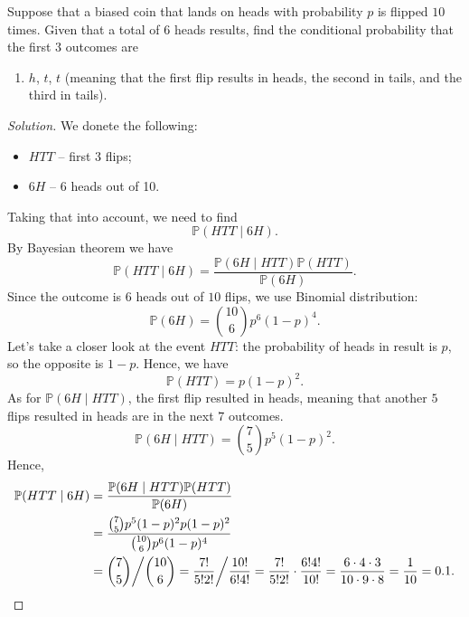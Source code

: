 \documentclass{article}[12pt]
\newenvironment{solution}
  {\renewcommand\qedsymbol{$\blacksquare$}\begin{proof}[Solution]}
  {\end{proof}}
\newenvironment{problem}[1]
  {\renewcommand\theinnercustomprblm{#1}\innercustomprblm}
  {\endinnercustomprblm}
\renewcommand{\P}{\mathbb{P}}
\begin{document}
\begin{problem}{4.50(a)}\normalfont
Suppose that a biased coin that lands on heads with probability $p$ is flipped $10$ times. 
Given that a total of $6$ heads results, find the conditional probability that the first $3$ outcomes are
\begin{enumerate}[label=(\alph*)]
    \item $h$, $t$, $t$ (meaning that the first flip results in heads, the second in tails, and the third in tails).
\end{enumerate}
\end{problem}
\begin{solution}
We donete the following:
\begin{itemize}
    \item $HTT$ -- first 3 flips;
    \item $6H$ -- 6 heads out of 10.
\end{itemize}
Taking that into account, we need to find
\begin{equation*}
    \P(HTT\mid 6H).
\end{equation*}
By Bayesian theorem we have
\begin{equation*}
    \P(HTT\mid 6H) = \dfrac{\P(6H\mid HTT)\P(HTT)}{\P(6H)}.
\end{equation*}
Since the outcome is $6$ heads out of $10$ flips, we use Binomial distribution:
\begin{equation*}
    \P(6H) = \binom{10}{6}p^{6}(1 - p)^{4}.
\end{equation*}
Let's take a closer look at the event $HTT$: the probability of heads in result is $p$, so the opposite is $1 - p$.
Hence, we have
\begin{equation*}
    \P(HTT) = p(1 - p)^{2}.
\end{equation*}
As for $\P(6H\mid HTT)$, the first flip resulted in heads, meaning that another $5$ flips resulted in heads are in the next $7$ outcomes.
\begin{equation*}
    \P(6H\mid HTT) = \binom{7}{5}p^{5}(1 - p)^{2}.
\end{equation*}
Hence,
\begin{align*}
    \P(HTT\mid 6H) &= \dfrac{\P(6H\mid HTT)\P(HTT)}{\P(6H)}
    \\
    &=\dfrac{\binom{7}{5}p^{5}(1 - p)^{2}p(1 - p)^{2}}{\binom{10}{6}p^{6}(1 - p)^{4}}
    \\
    &=\dbinom{7}{5}\bigg/\dbinom{10}{6} = \dfrac{7!}{5!2!}\bigg/\dfrac{10!}{6!4!} = \dfrac{7!}{5!2!}\cdot\dfrac{6!4!}{10!} = \dfrac{6\cdot 4\cdot 3}{10\cdot 9\cdot 8} = \dfrac{1}{10} = 0.1.
\end{align*}
\end{solution}
\end{document}
